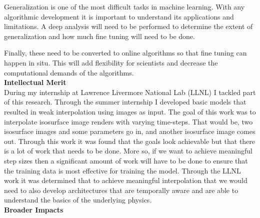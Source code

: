 \documentclass[12pt]{article}
\begin{document}
\noindent
Generalization is one of the most difficult tasks in machine learning. With any
algorithmic development it is important to understand its applications and
limitations. A deep analysis will need to be performed to determine the extent
of generalization and how much fine tuning will need to be done. 

\noindent
Finally, these need to be converted to online algorithms so that fine tuning can
happen in situ. This will add flexibility for scientists and decrease the
computational demands of the algorithms. 
\\
\noindent
\textbf{Intellectual Merit}
\\\noindent
During my internship at Lawrence Livermore National Lab (LLNL) I tackled part of
this research. Through the summer internship I developed basic models that
resulted in weak interpolation using images as input. The goal of this work was
to interpolate isosurface image renders with varying time-steps. That would be,
two isosurface images and some parameters go in, and another isosurface image
comes out. Through this work it was found that the goals look achievable but
that there is a lot of work that needs to be done. More so, if we want to
achieve meaningful step sizes then a significant amount of work will have to be
done to ensure that the training data is most effective for training the model.
Through the LLNL work it was determined that to achieve meaningful interpolation
that we would need to also develop architectures that are temporally aware and
are able to understand the basics of the underlying physics. 
%
\\\textbf{Broader Impacts} 
\\\noindent


\footnotesize
\begin{thebibliography}{aa}


\end{thebibliography}
\end{document}
